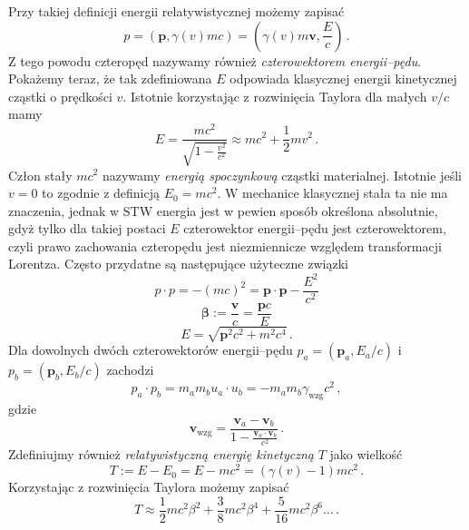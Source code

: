\documentclass[../main.tex]{subfiles}
\begin{document}
\noindent Przy takiej definicji energii relatywistycznej możemy zapisać
\begin{equation*}
    p=(\mathbf{p},\gamma(v)mc)=\left(\gamma(v)m\mathbf{v},\frac{E}{c}\right)\,.
\end{equation*}
Z tego powodu czteropęd nazywamy również \textit{czterowektorem energii--pędu}. Pokażemy teraz, że tak zdefiniowana \(E\) odpowiada klasycznej energii kinetycznej cząstki o prędkości \(v\). Istotnie korzystając z rozwinięcia Taylora dla małych \(v/c\) mamy
\begin{equation*}
    E=\frac{mc^2}{\sqrt{1-\frac{v^2}{c^2}}}\approx mc^2+\frac{1}{2}mv^2\,.
\end{equation*}
Człon stały \(mc^2\) nazywamy \textit{energią spoczynkową} cząstki materialnej. Istotnie jeśli \(v=0\) to zgodnie z definicją \(E_0=mc^2\). W mechanice klasycznej stała ta nie ma znaczenia, jednak w STW energia jest w pewien sposób określona absolutnie, gdyż tylko dla takiej postaci \(E\) czterowektor energii--pędu jest czterowektorem, czyli prawo zachowania czteropędu jest niezmiennicze względem transformacji Lorentza. Często przydatne są następujące użyteczne związki
\begin{equation*}
    p\cdot p=-(mc)^2=\mathbf{p}\cdot\mathbf{p}-\frac{E^2}{c^2}
\end{equation*}
\begin{equation*}
    \boldsymbol{\beta}:=\frac{\mathbf{v}}{c}=\frac{\mathbf{p}c}{E}
\end{equation*}
\begin{equation*}
    E=\sqrt{\mathbf{p}^2c^2+m^2c^4}\,.
\end{equation*}
Dla dowolnych dwóch czterowektorów energii--pędu \(p_a=(\mathbf{p}_a,E_a/c)\) i \(p_b=(\mathbf{p}_b,E_b/c)\) zachodzi
\begin{equation*}
    p_a\cdot p_b=m_am_bu_a\cdot u_b=-m_am_b\gamma_\text{wzg}c^2\,,
\end{equation*}
gdzie
\begin{equation*}
    \mathbf{v}_\text{wzg}=\frac{\mathbf{v}_a-\mathbf{v}_b}{1-\frac{\mathbf{v}_a\cdot\mathbf{v}_b}{c^2}}\,.
\end{equation*}
Zdefiniujmy również \textit{relatywistyczną energię kinetyczną} \(T\) jako wielkość
\begin{equation*}
    T:=E-E_0=E-mc^2=(\gamma(v)-1)mc^2\,.
\end{equation*}
Korzystając z rozwinięcia Taylora możemy zapisać
\begin{equation*}
    T\approx \frac{1}{2}mc^2\beta^2+\frac{3}{8}mc^2\beta^4+\frac{5}{16}mc^2\beta^6\dotso\,.
\end{equation*}
\end{document}
